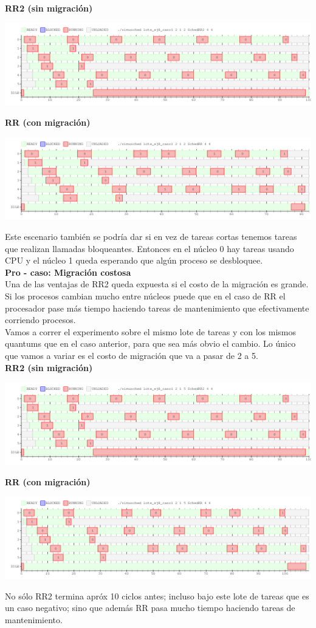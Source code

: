\textbf{RR2 (sin migración)}
\begin{center}
 \includegraphics[scale=0.48]{./RR2/caso1RR2.png}
\end{center}

\textbf{RR (con migración)}
\begin{center}
 \includegraphics[scale=0.48]{./RR2/caso1RR.png}
\end{center}

Este escenario también se podría dar si en vez de tareas cortas tenemos tareas que realizan llamadas bloqueantes.
Entonces en el núcleo 0 hay tareas usando CPU y el núcleo 1 queda esperando que algún proceso se desbloquee.\\

\textbf{Pro - caso: Migración costosa}\\
Una de las ventajas de RR2 queda expuesta si el costo de la migración es grande.
Si los procesos cambian mucho entre núcleos puede que en el caso de RR 
el procesador pase más tiempo haciendo tareas de mantenimiento que efectivamente corriendo procesos.\\

Vamos a correr el experimento sobre el mismo lote de tareas y con los mismos
quantums que en el caso anterior, para que sea más obvio el cambio. Lo único
que vamos a variar es el costo de migración que va a pasar de 2 a 5.\\

\textbf{RR2 (sin migración)}
\begin{center}
 \includegraphics[scale=0.48]{./RR2/caso2RR2.png}
\end{center}

\textbf{RR (con migración)}
\begin{center}
 \includegraphics[scale=0.48]{./RR2/caso2RR.png}
\end{center}

No sólo RR2 termina apróx 10 ciclos antes; incluso bajo este lote de tareas que 
es un caso negativo; sino que además RR pasa mucho tiempo haciendo 
tareas de mantenimiento.